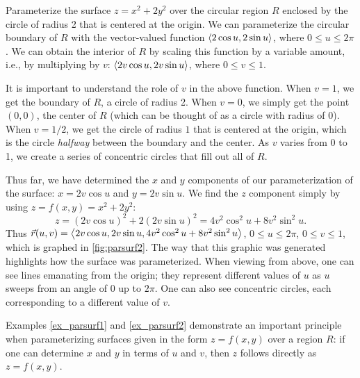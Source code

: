 \begin{example}\label{ex_parsurf2}%
Parameterize the surface $z=x^2+2y^2$ over the circular region $R$ enclosed by the circle of radius 2 that is centered at the origin.
%
%
\solution
We can parameterize the circular boundary of $R$ with the vector-valued function $\left\langle 2\cos u,2\sin u\right\rangle$, where $0\leq u\leq 2\pi$. We can obtain the interior of $R$ by scaling this function by a variable amount, i.e., by multiplying by $v$: $\left\langle 2v\cos u,2v\sin u\right\rangle$, where $0\leq v\leq 1$.

It is important to understand the role of $v$ in the above function. When $v=1$, we get the boundary of $R$, a circle of radius 2. When $v=0$, we simply get the point $(0,0)$, the center of $R$ (which can be thought of as a circle with radius of 0). When $v=1/2$, we get the circle of radius $1$ that is centered at the origin, which is the circle \emph{halfway} between the boundary and the center. As $v$ varies from 0 to 1, we create a series of concentric circles that fill out all of $R$.

Thus far, we have determined the $x$ and $y$ components of our parameterization of the surface: $x=2v\cos u$ and $y=2v\sin u$. We find the $z$ component simply by using $z = f(x,y) = x^2+2y^2$: 
\[z = (2v\cos u)^2+2(2v\sin u)^2 = 4v^2\cos^2u+8v^2\sin^2u.\]
Thus $\vec r(u,v) =\left\langle 2v\cos u,2v\sin u,4v^2\cos^2u+8v^2\sin^2u\right\rangle$, $0\leq u\leq 2\pi$, $0\leq v\leq 1$, which is graphed in \autoref{fig:parsurf2}. The way that this graphic was generated highlights how the surface was parameterized. When viewing from above, one can see lines emanating from the origin; they represent different values of $u$ as $u$ sweeps from an angle of 0 up to $2\pi$. One can also see concentric circles, each corresponding to a different value of $v$.
\end{example}

Examples \ref{ex_parsurf1} and \ref{ex_parsurf2} demonstrate an important principle when parameterizing surfaces given in the form $z=f(x,y)$ over a region $R$: if one can determine $x$ and $y$ in terms of $u$ and $v$, then $z$ follows directly as $z=f(x,y)$. 

